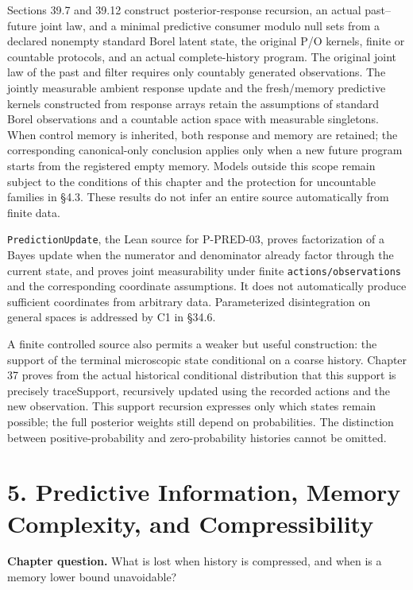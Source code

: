 \documentclass[
  english,
  11pt,
  oneside]{book}
\newcounter{none} %
\begin{document}
Sections 39.7 and 39.12 construct posterior-response recursion, an actual past--future joint law, and a minimal predictive consumer modulo null sets from a declared nonempty standard Borel latent state, the original P/O kernels, finite or countable protocols, and an actual complete-history program. The original joint law of the past and filter requires only countably generated observations. The jointly measurable ambient response update and the fresh/memory predictive kernels constructed from response arrays retain the assumptions of standard Borel observations and a countable action space with measurable singletons. When control memory is inherited, both response and memory are retained; the corresponding canonical-only conclusion applies only when a new future program starts from the registered empty memory. Models outside this scope remain subject to the conditions of this chapter and the protection for uncountable families in §4.3. These results do not infer an entire source automatically from finite data.

\nolinkurl{PredictionUpdate}, the Lean source for P-PRED-03, proves factorization of a Bayes update when the numerator and denominator already factor through the current state, and proves joint measurability under finite \nolinkurl{actions/observations} and the corresponding coordinate assumptions. It does not automatically produce sufficient coordinates from arbitrary data. Parameterized disintegration on general spaces is addressed by C1 in §34.6.

A finite controlled source also permits a weaker but useful construction: the support of the terminal microscopic state conditional on a coarse history. Chapter 37 proves from the actual historical conditional distribution that this support is precisely traceSupport, recursively updated using the recorded actions and the new observation. This support recursion expresses only which states remain possible; the full posterior weights still depend on probabilities. The distinction between positive-probability and zero-probability histories cannot be omitted.

\chapter{5. Predictive Information, Memory Complexity, and Compressibility}\label{ch-5}

\textbf{Chapter question.} What is lost when history is compressed, and when is a memory lower bound unavoidable?
\end{document}
